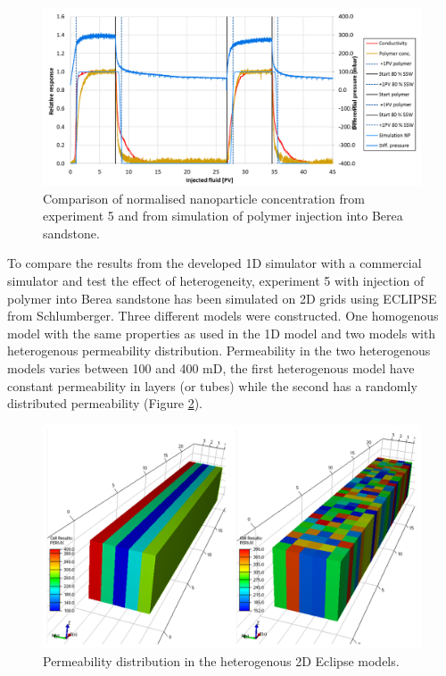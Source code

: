 \begin{figure}[h]
    \centering
    \includegraphics[width=\textwidth]{img/cht/simExpNP5.png}
    \caption{Comparison of normalised nanoparticle concentration from experiment 5 and from simulation of polymer injection into Berea sandstone.}
    \label{cht:simExpNP5}
\end{figure}

To compare the results from the developed 1D simulator with a commercial simulator and test the effect of heterogeneity, experiment 5 with injection of polymer into Berea sandstone has been simulated on 2D grids using ECLIPSE from Schlumberger. Three different models were constructed. One homogenous model with the same properties as used in the 1D model and two models with heterogenous permeability distribution. Permeability in the two heterogenous models varies between 100 and 400 mD, the first heterogenous model have constant permeability in layers (or tubes) while the second has a randomly distributed permeability (Figure \ref{cht:sim2dPerm}). 

\begin{figure}[h]
    \centering
    \includegraphics[width=\textwidth]{img/cht/sim2dPerm.png}
    \caption{Permeability distribution in the heterogenous 2D Eclipse models.}
    \label{cht:sim2dPerm}
\end{figure}

